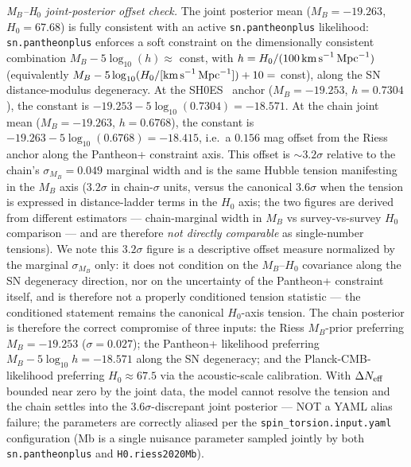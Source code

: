 \documentclass[aps,prd,twocolumn,superscriptaddress,showpacs,preprintnumbers,nofootinbib,longbibliography,floatfix]{revtex4-2}
\newcommand{\Neff}{N_{\rm eff}}
\begin{document}
\textit{M$_B$--H$_0$ joint-posterior offset check.} The joint posterior mean
($M_B = -19.263$, $H_0 = 67.68$) is fully consistent with an active
\texttt{sn.pantheonplus} likelihood: \texttt{sn.pantheonplus} enforces a
soft constraint on the dimensionally consistent combination
$M_B - 5\log_{10}(h) \approx$ const, with
$h = H_0/(100\,\text{km\,s}^{-1}\,\text{Mpc}^{-1})$ (equivalently
$M_B - 5\log_{10}(H_0/[\text{km\,s}^{-1}\,\text{Mpc}^{-1}]) + 10 =$ const),
along the SN distance-modulus degeneracy. At the SH0ES~\cite{Riess2022} anchor
($M_B = -19.253$, $h = 0.7304$), the constant is
$-19.253 - 5\log_{10}(0.7304) = -18.571$. At the chain joint mean
($M_B = -19.263$, $h = 0.6768$), the constant is
$-19.263 - 5\log_{10}(0.6768) = -18.415$, i.e.\ a $0.156$ mag offset from
the Riess anchor along the Pantheon+ constraint axis. This offset is
$\sim 3.2\sigma$ relative to the chain's $\sigma_{M_B} = 0.049$ marginal
width and is the same Hubble tension manifesting in the $M_B$ axis
($3.2\sigma$ in chain-$\sigma$ units, versus the canonical $3.6\sigma$
when the tension is expressed in distance-ladder
terms in the $H_0$ axis; the two figures are derived from different
estimators --- chain-marginal width in $M_B$ vs survey-vs-survey
$H_0$ comparison --- and are therefore \emph{not directly comparable}
as single-number tensions). We note this $3.2\sigma$ figure is a
descriptive offset measure normalized by the marginal $\sigma_{M_B}$
only: it does not condition on the $M_B$--$H_0$ covariance along the SN
degeneracy direction, nor on the uncertainty of the Pantheon+ constraint
itself, and is therefore not a properly conditioned tension statistic ---
the conditioned statement remains the canonical $H_0$-axis tension. The chain posterior is therefore the correct compromise of three
inputs: the Riess $M_B$-prior preferring $M_B = -19.253$ ($\sigma=0.027$);
the Pantheon+ likelihood preferring $M_B - 5\log_{10} h = -18.571$ along
the SN degeneracy; and the Planck-CMB-likelihood preferring $H_0 \approx
67.5$ via the acoustic-scale calibration. With $\Delta\Neff$ bounded
near zero by the joint data, the model cannot resolve the tension and
the chain settles into the 3.6$\sigma$-discrepant joint posterior ---
NOT a YAML alias failure; the parameters are correctly aliased per the
\texttt{spin\_torsion.input.yaml} configuration (Mb is a single
nuisance parameter sampled jointly by both \texttt{sn.pantheonplus} and
\texttt{H0.riess2020Mb}).
\end{document}
